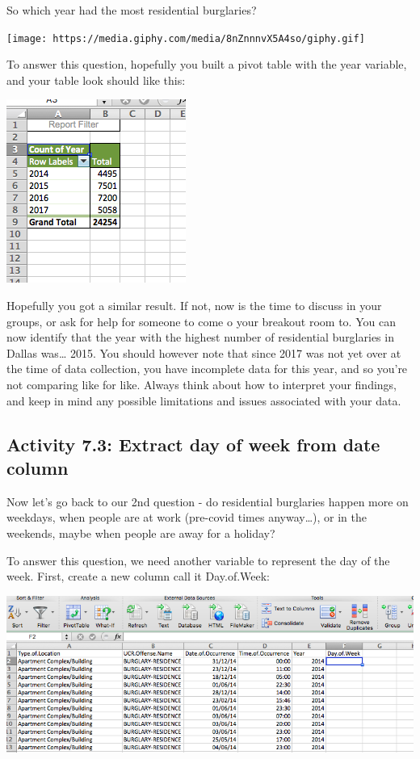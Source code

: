 \documentclass[
]{book}
\begin{document}
So which year had the most residential burglaries?

\texttt{[image: https://media.giphy.com/media/8nZnnnvX5A4so/giphy.gif]}

To answer this question, hopefully you built a pivot table with the year variable, and your table look should like this:

\includegraphics{imgs/count_of_yr.png}

Hopefully you got a similar result. If not, now is the time to discuss in your groups, or ask for help for someone to come o your breakout room to. You can now identify that the year with the highest number of residential burglaries in Dallas was\ldots{} 2015. You should however note that since 2017 was not yet over at the time of data collection, you have incomplete data for this year, and so you're not comparing like for like. Always think about how to interpret your findings, and keep in mind any possible limitations and issues associated with your data.

\hypertarget{activity-7.3-extract-day-of-week-from-date-column}{%
\subsection{Activity 7.3: Extract day of week from date column}\label{activity-7.3-extract-day-of-week-from-date-column}}

Now let's go back to our 2nd question - do residential burglaries happen more on weekdays, when people are at work (pre-covid times anyway\ldots), or in the weekends, maybe when people are away for a holiday?

To answer this question, we need another variable to represent the day of the week. First, create a new column call it Day.of.Week:

\includegraphics{imgs/create_day_of_wk_col.png}
\end{document}
